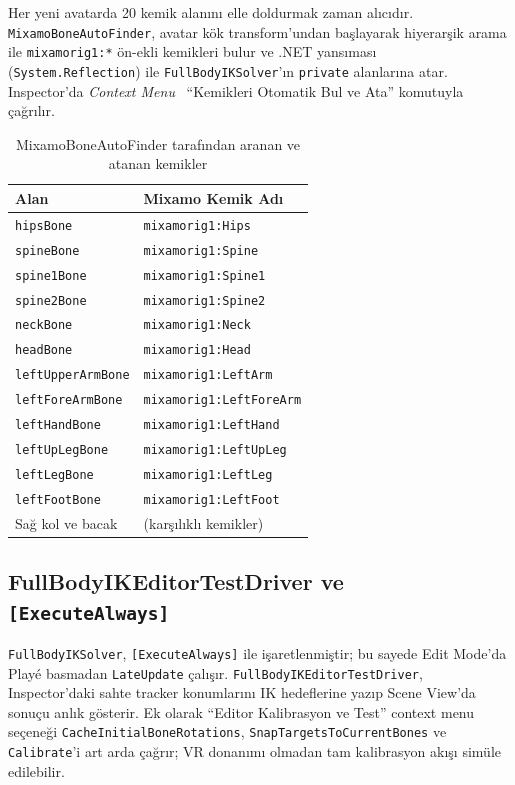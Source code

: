 \documentclass[11pt,a4paper]{article}
\begin{document}
Her yeni avatarda 20 kemik alanını elle doldurmak zaman al{\i}c{\i}d{\i}r.
\texttt{MixamoBoneAutoFinder}, avatar kök transform'undan ba\c{s}layarak
hiyerar\c{s}ik arama ile \texttt{mixamorig1:*} ön-ekli kemikleri
bulur ve .NET yans{\i}mas{\i} (\texttt{System.Reflection}) ile
\texttt{FullBodyIKSolver}'{\i}n \texttt{private} alanlar{\i}na atar.
Inspector'da \textit{Context Menu} \textrightarrow\
``Kemikleri Otomatik Bul ve Ata'' komutuyla \c{c}a\u{g}r{\i}l{\i}r.

\begin{table}[H]
\centering
\caption{MixamoBoneAutoFinder taraf{\i}ndan aranan ve atanan kemikler}
\label{tab:auto_bones}
\renewcommand{\arraystretch}{1.1}
\begin{tabular}{ll}
\toprule
\textbf{Alan} & \textbf{Mixamo Kemik Ad{\i}} \\
\midrule
\texttt{hipsBone}         & \texttt{mixamorig1:Hips} \\
\texttt{spineBone}        & \texttt{mixamorig1:Spine} \\
\texttt{spine1Bone}       & \texttt{mixamorig1:Spine1} \\
\texttt{spine2Bone}       & \texttt{mixamorig1:Spine2} \\
\texttt{neckBone}         & \texttt{mixamorig1:Neck} \\
\texttt{headBone}         & \texttt{mixamorig1:Head} \\
\texttt{leftUpperArmBone} & \texttt{mixamorig1:LeftArm} \\
\texttt{leftForeArmBone}  & \texttt{mixamorig1:LeftForeArm} \\
\texttt{leftHandBone}     & \texttt{mixamorig1:LeftHand} \\
\texttt{leftUpLegBone}    & \texttt{mixamorig1:LeftUpLeg} \\
\texttt{leftLegBone}      & \texttt{mixamorig1:LeftLeg} \\
\texttt{leftFootBone}     & \texttt{mixamorig1:LeftFoot} \\
Sa\u{g} kol ve bacak & (kar\c{s}{\i}l{\i}kl{\i} kemikler) \\
\bottomrule
\end{tabular}
\end{table}

\subsection{FullBodyIKEditorTestDriver ve \texttt{[ExecuteAlways]}}

\texttt{FullBodyIKSolver}, \texttt{[ExecuteAlways]} ile
i\c{s}aretlenmi\c{s}tir; bu sayede Edit Mode'da Play\'e basmadan
\texttt{LateUpdate} \c{c}al{\i}\c{s}{\i}r. \texttt{FullBodyIKEditorTestDriver},
Inspector'daki sahte tracker konumlar{\i}n{\i} IK hedeflerine
yaz{\i}p Scene View'da sonu\c{c}u anl{\i}k g\"osterir.
Ek olarak ``Editor Kalibrasyon ve Test'' context menu seçeneği
\texttt{CacheInitialBoneRotations}, \texttt{SnapTargetsToCurrentBones}
ve \texttt{Calibrate}'i art arda \c{c}a\u{g}r{\i}r; VR
donan{\i}m{\i} olmadan tam kalibrasyon ak{\i}\c{s}{\i} simüle edilebilir.
\end{document}
